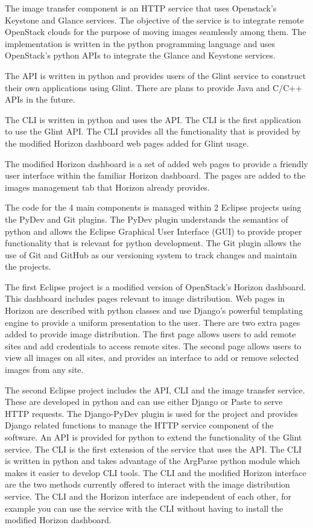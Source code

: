 \documentclass[a4paper]{jpconf}
\begin{document}
The image transfer component is an HTTP service that uses Openstack's Keystone and Glance services. The objective of the service is to integrate remote OpenStack clouds for the purpose of moving images seamlessly among them. The implementation is written in the python programming language and uses OpenStack's python APIs to integrate the Glance and Keystone services.

The API is written in python and provides users of the Glint service to construct their own applications using Glint. There are plans to provide Java and C/C++ APIs in the future.

The CLI is written in python and uses the API. The CLI is the first application to use the Glint API. The CLI provides all the functionality that is provided by the modified Horizon dashboard web pages added for Glint usage.

The modified Horizon dashboard is a set of added web pages to provide a friendly user interface within the familiar Horizon dashboard. The pages are added to the images management tab that Horizon already provides. 

The code for the 4 main components is managed within 2 Eclipse projects using the PyDev and Git plugins. The PyDev plugin understands the semantics of python and allows the Eclipse Graphical User Interface (GUI) to provide proper functionality that is relevant for python development. The Git plugin allows the use of Git and GitHub as our versioning system to track changes and maintain the projects. 

The first Eclipse project is a modified version of OpenStack's Horizon dashboard. This dashboard includes pages relevant to image distribution. Web pages in Horizon are described with python classes and use Django's powerful templating engine to provide a uniform presentation to the user. There are two extra pages added to provide image distribution. The first page allows users to add remote sites and add credentials to access remote sites. The second page allows users to view all images on all sites, and provides an interface to add or remove selected images from any site.

The second Eclipse project includes the API, CLI and the image transfer service. These are developed in python and can use either Django or Paste to serve HTTP requests. The Django-PyDev plugin is used for the project and provides Django related functions to manage the HTTP service component of the software. An API is provided for python to extend the functionality of the Glint service. The CLI is the first extension of the service that uses the API. The CLI is written in python and takes advantage of the ArgParse python module which makes it easier to develop CLI tools. The CLI and the modified Horizon interface are the two methods currently offered to interact with the image distribution service. The CLI and the Horizon interface are independent of each other, for example you can use the service with the CLI without having to install the modified Horizon dashboard.
\end{document}
